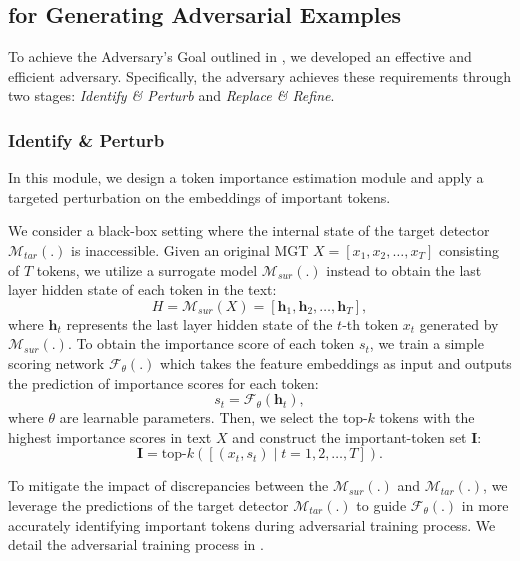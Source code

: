 \subsection{\attackname for Generating Adversarial Examples}
\label{sec:advgen}
To achieve the Adversary's Goal outlined in , we developed an effective and efficient adversary. Specifically, the adversary achieves these requirements through two stages: \textit{Identify \& Perturb} and \textit{Replace \& Refine}.

\subsubsection{Identify \& Perturb}\label{AEG}
In this module, we design a token importance estimation module and apply a targeted perturbation on the embeddings of important tokens.

We consider a black-box setting where the internal state of the target detector $\mathcal{M}_{tar}(.)$ is inaccessible.
Given an original MGT $X = [x_1, x_2, \ldots, x_T]$ consisting of $T$ tokens, we utilize a surrogate model $\mathcal{M}_{sur}(.)$ instead to obtain the last layer hidden state of each token in the text:
\begin{equation}
\label{eq:1}
H = \mathcal{M}_{sur}(X) = [\mathbf{h}_1, \mathbf{h}_2, \ldots, \mathbf{h}_T],
\end{equation}
where $\mathbf{h}_t$ represents the last layer hidden state of the $t$-th token $x_t$ generated by $\mathcal{M}_{sur}(.)$.
To obtain the importance score of each token $s_t$, we train a simple scoring network $\mathcal{F}_{\theta}(.)$ which takes the feature embeddings as input and outputs the prediction of importance scores for each token:
\begin{equation}
\label{eq:2}
s_t = \mathcal{F}_{\theta}(\mathbf{h}_t),
\end{equation}
where $\theta$ are learnable parameters.
Then, we select the top-$k$ tokens with the highest importance scores in text $X$ and construct the important-token set $\mathbf{I}$:
\begin{equation}
\label{eq:3}
\mathbf{I}=\text{top-$k$}\left([ (x_t, s_t) \mid t = 1, 2, \dots, T ]\right).
\end{equation}

To mitigate the impact of discrepancies between the $\mathcal{M}_{sur}(.)$ and $\mathcal{M}_{tar}(.)$, we leverage the predictions of the target detector $\mathcal{M}_{tar}(.)$ to guide $\mathcal{F}_{\theta}(.)$ in more accurately identifying important tokens during adversarial training process. 
We detail the adversarial training process in .

